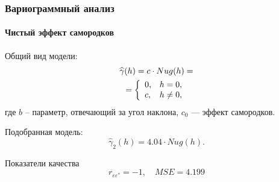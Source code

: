 \documentclass{beamer}
\begin{document}
\begin{frame}
  \frametitle{Вариограммный анализ}
  \framesubtitle{Чистый эффект самородков}
  \begin{multicols}{2}
    \begin{small}
      Общий вид модели:
      \begin{equation}\begin{gathered}
        \label{eq:nug}
        \widehat{\gamma}(h) = c \cdot Nug(h) = \\ = \left\{
        \begin{array}{l l}
          0, & h = 0, \\
          c, & h \neq 0,
        \end{array} \right.
      \end{gathered}\end{equation}
      где $ b $ -- параметр, отвечающий за угол наклона, $ c_0 $ --- эффект самородков.
      
      \medskip
      
      Подобранная модель:
      \begin{equation}
        \label{eq:gamma2}
        \widehat{\gamma}_2(h) = 4.04 \cdot Nug(h).
      \end{equation}
      
      Показатели качества
      \begin{equation*}
        r_{\varepsilon\varepsilon^{*}} = -1, \quad MSE = 4.199
      \end{equation*}
    \end{small}
    

\end{multicols}
\end{frame}
\end{document}
